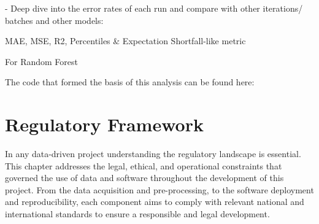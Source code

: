 \documentclass[12pt]{report} %
\begin{document}
- Deep dive into the error rates of each run and compare with other iterations/ batches and other models:

MAE, MSE, R2, Percentiles \& Expectation Shortfall-like metric

For Random Forest







The code that formed the basis of this analysis can be found here:

\chapter{Regulatory Framework}

In any data-driven project understanding the regulatory landscape is essential. This chapter addresses the legal, ethical, and operational constraints that governed the use of data and software throughout the development of this project. From the data acquisition and pre-processing, to the software deployment and reproducibility, each component aims to comply with relevant national and international standards to ensure a responsible and legal development.
\end{document}
